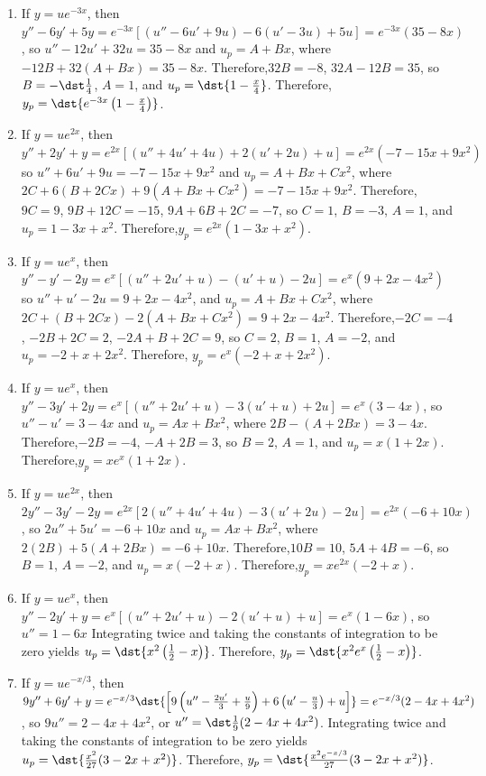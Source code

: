 \documentclass[openany]{book}
\newenvironment{sectionSolutions}{
 \begin{enumerate}[item-label={\thesection.\arabic{enumi}.}]
}{
 \end{enumerate}
}
\begin{document}
\begin{sectionSolutions}
\item
If $y=ue^{-3x}$, then
$y''-6y'+5y=e^{-3x}\left[(u''-6u'+9u)-6(u'-3u)+5u\right]=
e^{-3x}(35-8x)$, so $u''-12u'+32u =35-8x$ and $u_p=A+Bx$, where
$-12B+32(A+Bx)=35-8x$. Therefore,$32B=-8$, $32A-12B=35$, so
$B=-\dst\frac{1}{4}$, $A=1$, and $u_p=\dst{1-\frac{x}{4}}$. Therefore,
$y_p=\dst{e^{-3x}\left(1-\frac{x}{4}\right)}$.

\item
If $y=ue^{2x}$, then
$y''+2y'+y=e^{2x}\left[(u''+4u'+4u)+2(u'+2u)+u\right]=
e^{2x}(-7-15x+9x^2)$ so $u''+6u'+9u =-7-15x+9x^2$ and $u_p=A+Bx+Cx^2$,
where $2C+6(B+2Cx)+9(A+Bx+Cx^2)=-7-15x+9x^2$. Therefore,$9C=9$,
$9B+12C=-15$, $9A+6B+2C=-7$, so $C=1$, $B=-3$, $A=1$, and
$u_p=1-3x+x^2$. Therefore,$y_p=e^{2x}(1-3x+x^2)$.


\item
If $y=ue^x$, then $y''-y'-2y=e^x\left[(u''+2u'+u)-(u'+u)-2u\right]=
e^x(9+2x-4x^2)$ so $u''+u'-2u =9+2x-4x^2$, and $u_p=A+Bx+Cx^2$, where
$2C+(B+2Cx)-2(A+Bx+Cx^2)=9+2x-4x^2$. Therefore,$-2C=-4$, $-2B+2C=2$,
$-2A+B+2C=9$, so $C=2$, $B=1$, $A=-2$, and $u_p=-2+x+2x^2$. Therefore,
$y_p=e^x(-2+x+2x^2)$.


\item
If $y=ue^x$, then $y''-3y'+2y=e^x\left[(u''+2u'+u)-3(u'+u)+2u\right]=
e^x(3-4x)$, so $u''-u'=3-4x$ and $u_p=Ax+Bx^2$, where
$2B-(A+2Bx)=3-4x$. Therefore,$-2B=-4$, $-A+2B=3$, so $B=2$, $A=1$, and
$u_p=x(1+2x)$. Therefore,$y_p=xe^x(1+2x)$.


\item
If $y=ue^{2x}$, then
$2y''-3y'-2y=e^{2x}\left[2(u''+4u'+4u)-3(u'+2u)-2u\right]=
e^{2x}(-6+10x)$, so $2u''+5u'=-6+10x$ and $u_p=Ax+Bx^2$, where
$2(2B)+5(A+2Bx)=-6+10x$. Therefore,$10B=10$, $5A+4B=-6$, so $B=1$,
$A=-2$, and $u_p=x(-2+x)$. Therefore,$y_p=xe^{2x}(-2+x)$.


\item
If $y=ue^x$, then $y''-2y'+y=e^x\left[(u''+2u'+u)-2(u'+u)+u\right]=
e^x(1-6x)$, so $u''=1-6x$ Integrating twice and taking the constants
of integration to be zero yields
$u_p=\dst{x^2\left(\frac{1}{2}-x\right)}$. Therefore,
$y_p=\dst{x^2e^x\left(\frac{1}{2}-x\right)}$.


\item
If $y=ue^{-x/3}$, then
$9y''+6y'+y=e^{-x/3}\dst{\left[9\left(u''-\frac{2u'}{3}+\frac{u}{9}\right)
+6\left(u'-\frac{u}{3}\right)+u\right]}= e^{-x/3}(2-4x+4x^2)$, so
$9u''=2-4x+4x^2$, or $u''=\dst\frac{1}{9}(2-4x+4x^2)$. Integrating twice
and taking the constants of integration to be zero yields
$u_p=\dst{\frac{x^2}{27}(3-2x+x^2)}$. Therefore,
$y_p=\dst{\frac{x^2e^{-x/3}}{27}(3-2x+x^2)}$.


\end{sectionSolutions}
\end{document}
